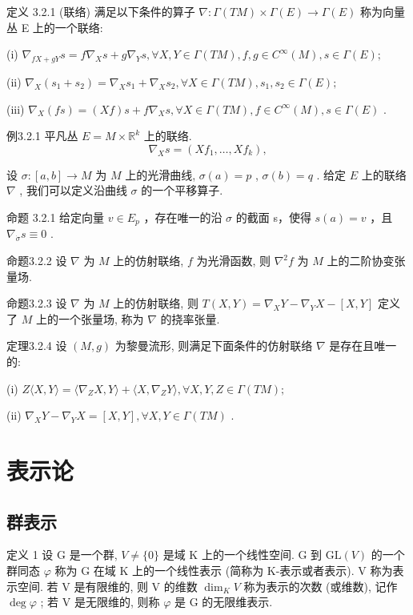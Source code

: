 \documentclass[]{article}
\begin{document}
定义 3.2.1 (联络) 满足以下条件的算子 $\nabla: \Gamma(TM) \times \Gamma(E) \to \Gamma(E)$ 称为向量丛 E 上的一个联络: 

(i) $\nabla_{fX + gY}s = f\nabla_Xs + g\nabla_Ys, \forall X,Y \in \Gamma(TM), f,g \in C^\infty(M), s \in \Gamma(E);$ 

(ii) $\nabla_X(s_1 + s_2) = \nabla_Xs_1 + \nabla_Xs_2, \forall X \in \Gamma(TM), s_1, s_2 \in \Gamma(E);$ 

(iii) $\nabla_X(fs) = (Xf)s + f\nabla_Xs, \forall X \in \Gamma(TM), f \in C^\infty(M), s \in \Gamma(E)$ . 

例3.2.1 平凡丛 $E = M \times \mathbb{R}^k$ 上的联络. $$
\nabla_ {X} s = (X f _ {1}, \dots , X f _ {k}),
$$

设 $\sigma: [a, b] \to M$ 为 $M$ 上的光滑曲线, $\sigma(a) = p$ , $\sigma(b) = q$ . 给定 $E$ 上的联络 $\nabla$ , 我们可以定义沿曲线 $\sigma$ 的一个平移算子. 

命题 3.2.1 给定向量 $v \in E_{p}$ ，存在唯一的沿 $\sigma$ 的截面 s，使得 $s(a) = v$ ，且 $\nabla_{\dot{\sigma}} s \equiv 0$ . 

命题3.2.2 设 $\nabla$ 为 $M$ 上的仿射联络, $f$ 为光滑函数, 则 $\nabla^2 f$ 为 $M$ 上的二阶协变张量场. 

命题3.2.3 设 $\nabla$ 为 $M$ 上的仿射联络, 则 $T(X,Y) = \nabla_X Y - \nabla_Y X - [X,Y]$ 定义了 $M$ 上的一个张量场, 称为 $\nabla$ 的挠率张量. 

定理3.2.4 设 $(M,g)$ 为黎曼流形, 则满足下面条件的仿射联络 $\nabla$ 是存在且唯一的: 

(i) $Z\langle X,Y\rangle = \langle \nabla_{Z}X,Y\rangle +\langle X,\nabla_{Z}Y\rangle ,\forall X,Y,Z\in \Gamma (TM);$ 

(ii) $\nabla_X Y - \nabla_Y X = [X, Y], \forall X, Y \in \Gamma(TM)$ .

\section{表示论}

\subsection{群表示}

定义 1 设 G 是一个群, $V \neq \{0\}$ 是域 K 上的一个线性空间. G 到 $\mathrm{GL}(V)$ 的一个群同态 $\varphi$ 称为 G 在域 K 上的一个线性表示 (简称为 K-表示或者表示). V 称为表示空间. 若 V 是有限维的, 则 V 的维数 $\dim_{K} V$ 称为表示的次数 (或维数), 记作 $\deg \varphi$ ; 若 V 是无限维的, 则称 $\varphi$ 是 G 的无限维表示. 
\end{document}
